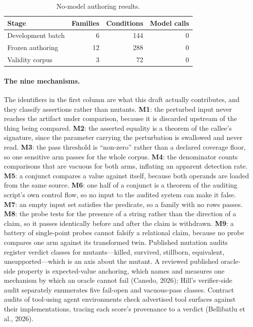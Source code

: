 \documentclass[11pt]{article}
\begin{document}
\begin{table}[h]
\centering
\caption{No-model authoring results.}
\label{tab:authoring}
\begin{tabular}{lrrr}
\toprule
Stage & Families & Conditions & Model calls\\
\midrule
Development batch & 6 & 144 & 0\\
Frozen authoring & 12 & 288 & 0\\
Validity corpus & 3 & 72 & 0\\
\bottomrule
\end{tabular}
\end{table}

\paragraph{The nine mechanisms.} The identifiers in the first column are what this draft actually contributes,
and they classify assertions rather than mutants. \textbf{M1}: the perturbed input never reaches the artifact
under comparison, because it is discarded upstream of the thing being compared. \textbf{M2}: the asserted
equality is a theorem of the callee's signature, since the parameter carrying the perturbation is swallowed and
never read. \textbf{M3}: the pass threshold is ``non-zero'' rather than a declared coverage floor, so one
sensitive arm passes for the whole corpus. \textbf{M4}: the denominator counts comparisons that are vacuous for
both arms, inflating an apparent detection rate. \textbf{M5}: a conjunct compares a value against itself,
because both operands are loaded from the same source. \textbf{M6}: one half of a conjunct is a theorem of the
auditing script's own control flow, so no input to the audited system can make it false. \textbf{M7}: an empty
input set satisfies the predicate, so a family with no rows passes. \textbf{M8}: the probe tests for the
presence of a string rather than the direction of a claim, so it passes identically before and after the claim
is withdrawn. \textbf{M9}: a battery of single-point probes cannot falsify a relational claim, because no probe
compares one arm against its transformed twin. Published mutation audits register verdict classes for
mutants---killed, survived, stillborn, equivalent, unsupported---which is an axis about the mutant. A reviewed published oracle-side property is expected-value anchoring, which names and measures one mechanism by which an oracle cannot fail (Canedo, 2026); Hill's verifier-side audit separately enumerates five fail-open and vacuous-pass classes. Contract audits of tool-using agent environments check advertised tool surfaces against their implementations, tracing each score's provenance to a verdict (Bellibatlu et al., 2026).
\end{document}
